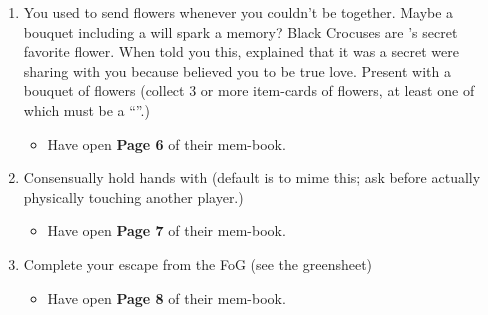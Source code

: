 \documentclass[green]{GL2020}
\begin{document}
\begin{enumerate}
\begin{itemize}
  \end{itemize}
  \item You used to send \cHeadScientist{} flowers whenever you couldn’t be together. Maybe a bouquet including a \iBlackCrocus{} will spark a memory? Black Crocuses are \cHeadScientist{}’s secret favorite flower. When \cHeadScientist{\they} told you this, \cHeadScientist{\they} explained that it was a secret \cHeadScientist{\they} were sharing with you because \cHeadScientist{} believed you to be \cHeadScientist{\their} true love. Present \cHeadScientist{} with a bouquet of flowers (collect 3 or more item-cards of flowers, at least one of which must be a ``\iBlackCrocus{}''.)
  \begin{itemize}
    \item Have \cHeadScientist{} open \textbf{Page 6} of their mem-book.
  \end{itemize}
  \item Consensually hold hands with \cHeadScientist{} (default is to mime this; ask before actually physically touching another player.)
  \begin{itemize}
    \item Have \cHeadScientist{} open \textbf{Page 7} of their mem-book.
  \end{itemize}
  \item Complete your escape from the FoG (see the greensheet)
  \begin{itemize}
    \item Have \cHeadScientist{} open \textbf{Page 8} of their mem-book.
  \end{itemize}
\end{enumerate}
\end{document}

